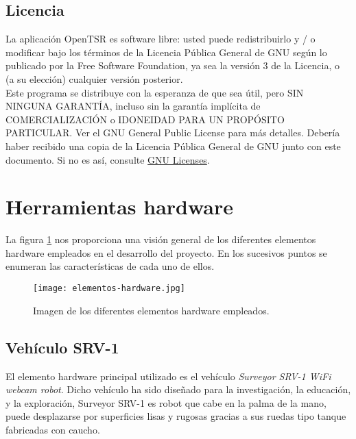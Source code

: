 \subsection{Licencia}

La aplicación OpenTSR es software libre: usted puede redistribuirlo y / o modificar bajo los términos de la Licencia Pública General de GNU según lo publicado por la Free Software Foundation, ya sea la versión 3 de la Licencia, o (a su elección) cualquier versión posterior.\\

Este programa se distribuye con la esperanza de que sea útil, pero SIN NINGUNA GARANTÍA, incluso sin la garantía implícita de COMERCIALIZACIÓN o IDONEIDAD PARA UN PROPÓSITO PARTICULAR. Ver el GNU General Public License para más detalles. Debería haber recibido una copia de la Licencia Pública General de GNU junto con este documento. Si no es así, consulte \href{http://www.gnu.org/licenses}{GNU Licenses}.

\section{Herramientas hardware}

La figura \ref{figura:elementos-hardware-empleados} nos proporciona una visión general de los diferentes elementos hardware empleados en el desarrollo del proyecto. En los sucesivos puntos se enumeran las características de cada uno de ellos.\\

\begin{figure}[H]
  \begin{center}
    \texttt{[image: elementos-hardware.jpg]}
  \end{center}
  \caption{Imagen de los diferentes elementos hardware empleados.}
  \label{figura:elementos-hardware-empleados}
\end{figure}

\subsection{Vehículo SRV-1}

El elemento hardware principal utilizado es el vehículo \emph{Surveyor SRV-1 WiFi webcam robot}. Dicho vehículo ha sido diseñado para la investigación, la educación, y la exploración, Surveyor SRV-1 es robot que cabe en la palma de la mano, puede desplazarse por superficies lisas y rugosas gracias a sus ruedas tipo tanque fabricadas con caucho. \\

